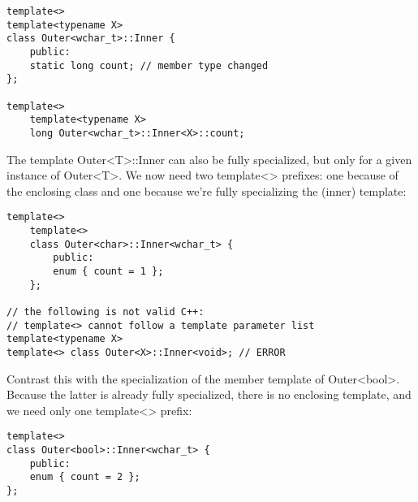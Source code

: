 \begin{lstlisting}[style=styleCXX]
template<>
template<typename X>
class Outer<wchar_t>::Inner {
	public:
	static long count; // member type changed
};

template<>
	template<typename X>
	long Outer<wchar_t>::Inner<X>::count;
\end{lstlisting}

The template Outer<T>::Inner can also be fully specialized, but only for a given instance of Outer<T>. We now need two template<> prefixes: one because of the enclosing class and one because we’re fully specializing the (inner) template:

\begin{lstlisting}[style=styleCXX]
template<>
	template<>
	class Outer<char>::Inner<wchar_t> {
		public:
		enum { count = 1 };
	};

// the following is not valid C++:
// template<> cannot follow a template parameter list
template<typename X>
template<> class Outer<X>::Inner<void>; // ERROR
\end{lstlisting}

Contrast this with the specialization of the member template of Outer<bool>. Because the latter is already fully specialized, there is no enclosing template, and we need only one template<> prefix:

\begin{lstlisting}[style=styleCXX]
template<>
class Outer<bool>::Inner<wchar_t> {
	public:
	enum { count = 2 };
};
\end{lstlisting}

































